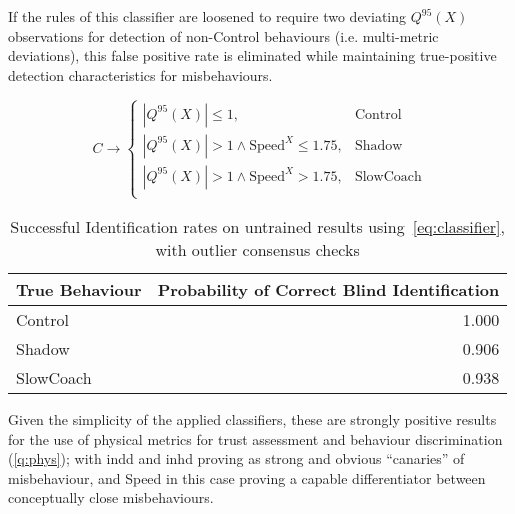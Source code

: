 If the rules of this classifier are loosened to require two deviating $Q^{95}(X)$ observations for detection of non-Control behaviours (i.e. multi-metric deviations), this false positive rate is eliminated while maintaining true-positive detection characteristics for misbehaviours.

\begin{equation}
C \rightarrow 
\begin{cases}
|Q^{95}(X)| \leq 1,& \text{Control}\\
|Q^{95}(X)| > 1 \land \text{Speed}^X \leq 1.75, & \text{Shadow}\\
|Q^{95}(X)| > 1 \land \text{Speed}^X > 1.75,& \text{SlowCoach}\\
\end{cases}
\label{eq:classifier_minority}
\end{equation}
\begin{table}[h]
  \caption{Successful Identification rates on untrained results using~\autoref{eq:classifier}, with outlier consensus checks}
  \centering
  \begin{tabular}{lr}
  	\toprule
  	True Behaviour &  Probability of Correct Blind Identification \\
  	\midrule
  	Control        &                                        1.000 \\
  	Shadow         &                                        0.906 \\
  	SlowCoach      &                                        0.938 \\
  	\bottomrule
  \end{tabular}
  \label{tab:classifier_minority}
\end{table}

Given the simplicity of the applied classifiers, these are strongly positive results for the use of physical metrics for trust assessment and behaviour discrimination (\autoref{q:phys}); with \gls{indd} and \gls{inhd} proving as strong and obvious ``canaries'' of misbehaviour, and Speed in this case proving a capable differentiator between conceptually close misbehaviours.


